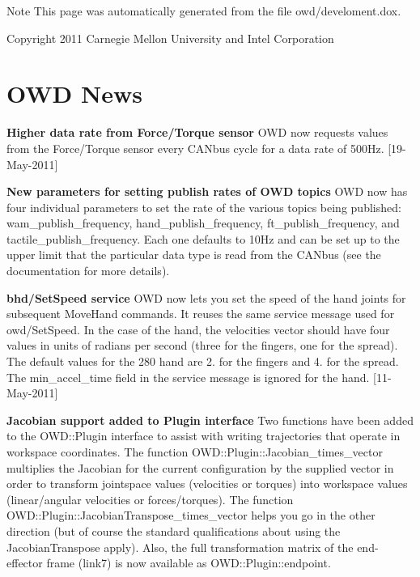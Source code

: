 \begin{DoxyNote}{Note}
This page was automatically generated from the file owd/develoment.\-dox.
\end{DoxyNote}
\begin{DoxyVerb}Copyright 2011 Carnegie Mellon University and Intel Corporation
\end{DoxyVerb}
 \hypertarget{news}{}\section{O\-W\-D News}\label{news}
{\bfseries Higher data rate from Force/\-Torque sensor} O\-W\-D now requests values from the Force/\-Torque sensor every C\-A\-Nbus cycle for a data rate of 500\-Hz. \mbox{[}19-\/\-May-\/2011\mbox{]}

{\bfseries New parameters for setting publish rates of O\-W\-D topics} O\-W\-D now has four individual parameters to set the rate of the various topics being published\-: wam\-\_\-publish\-\_\-frequency, hand\-\_\-publish\-\_\-frequency, ft\-\_\-publish\-\_\-frequency, and tactile\-\_\-publish\-\_\-frequency. Each one defaults to 10\-Hz and can be set up to the upper limit that the particular data type is read from the C\-A\-Nbus (see the documentation for more details).

{\bfseries bhd/\-Set\-Speed service} O\-W\-D now lets you set the speed of the hand joints for subsequent Move\-Hand commands. It reuses the same service message used for owd/\-Set\-Speed. In the case of the hand, the velocities vector should have four values in units of radians per second (three for the fingers, one for the spread). The default values for the 280 hand are 2. for the fingers and 4. for the spread. The min\-\_\-accel\-\_\-time field in the service message is ignored for the hand. \mbox{[}11-\/\-May-\/2011\mbox{]}

{\bfseries Jacobian support added to Plugin interface} Two functions have been added to the O\-W\-D\-::\-Plugin interface to assist with writing trajectories that operate in workspace coordinates. The function O\-W\-D\-::\-Plugin\-::\-Jacobian\-\_\-times\-\_\-vector multiplies the Jacobian for the current configuration by the supplied vector in order to transform jointspace values (velocities or torques) into workspace values (linear/angular velocities or forces/torques). The function O\-W\-D\-::\-Plugin\-::\-Jacobian\-Transpose\-\_\-times\-\_\-vector helps you go in the other direction (but of course the standard qualifications about using the Jacobian\-Transpose apply). Also, the full transformation matrix of the end-\/effector frame (link7) is now available as O\-W\-D\-::\-Plugin\-::endpoint.


